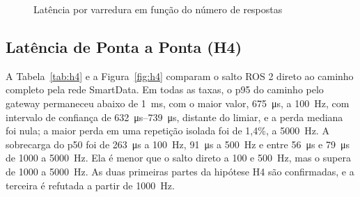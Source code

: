 \documentclass[
    12pt,
    oneside,
    a4paper,
    chapter=TITLE,
    section=TITLE,
    english,
    brazil
]{abntex2}
\begin{document}
\begin{figure}[H]
\centering
\caption{Latência por varredura em função do número de respostas}
\label{fig:h3}
\end{figure}

\subsection{Latência de Ponta a Ponta (H4)}
A Tabela~\ref{tab:h4} e a Figura~\ref{fig:h4} comparam o salto ROS 2
direto ao caminho completo pela rede SmartData. Em todas as taxas, o p95
do caminho pelo gateway permaneceu abaixo de \SI{1}{\milli\second}, com o
maior valor, \SI{675}{\micro\second}, a \SI{100}{\hertz}, com intervalo
de confiança de \SIrange{632}{739}{\micro\second}, distante do limiar, e a perda
mediana foi nula; a maior perda em uma repetição isolada foi de 1,4\%, a
\SI{5000}{\hertz}. A sobrecarga do p50 foi de \SI{263}{\micro\second} a
\SI{100}{\hertz}, \SI{91}{\micro\second} a \SI{500}{\hertz} e entre
\SI{56}{\micro\second} e \SI{79}{\micro\second} de \num{1000} a
\SI{5000}{\hertz}. Ela é menor que o salto direto a 100 e
\SI{500}{\hertz}, mas o supera de \num{1000} a \SI{5000}{\hertz}. As
duas primeiras partes da hipótese H4 são confirmadas, e a terceira é
refutada a partir de \SI{1000}{\hertz}.
\end{document}
